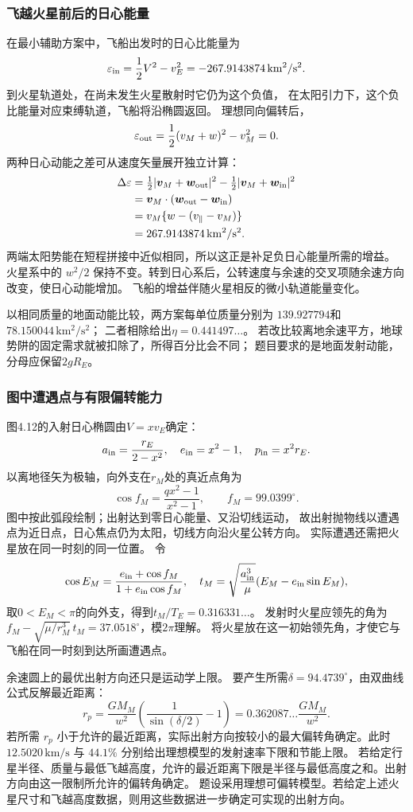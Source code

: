 \documentclass[UTF8,fontset=fandol,a4paper,11pt]{ctexart}
\newcommand{\vect}[1]{\bm{#1}}
\begin{document}
\subsubsection*{飞越火星前后的日心能量}
在最小辅助方案中，飞船出发时的日心比能量为
\[
\varepsilon_{\rm in}
=\frac12V^2-v_E^2
 =-267.9143874\,\mathrm{km^2/s^2}.
\]
到火星轨道处，在尚未发生火星散射时它仍为这个负值，
在太阳引力下，这个负比能量对应束缚轨道，飞船将沿椭圆返回。
理想同向偏转后，
\[
\varepsilon_{\rm out}
=\frac12(v_M+w)^2-v_M^2=0.
\]
两种日心动能之差可从速度矢量展开独立计算：
\[
\begin{aligned}
\Delta\varepsilon
&=\tfrac12|\vect v_M+\vect w_{\rm out}|^2
-\tfrac12|\vect v_M+\vect w_{\rm in}|^2\\
&=\vect v_M\cdot(\vect w_{\rm out}-\vect w_{\rm in})\\
&=v_M\{w-(v_\parallel-v_M)\}\\
&=267.9143874\,\mathrm{km^2/s^2}.
\end{aligned}
\]
两端太阳势能在短程拼接中近似相同，所以这正是补足负日心能量所需的增益。
火星系中的 $w^2/2$ 保持不变。转到日心系后，公转速度与余速的交叉项随余速方向改变，使日心动能增加。
飞船的增益伴随火星相反的微小轨道能量变化。

以相同质量的地面动能比较，两方案每单位质量分别为
$139.927794$和$78.150044\,\mathrm{km^2/s^2}$；
二者相除给出$\eta=0.441497\ldots$。
若改比较离地余速平方，地球势阱的固定需求就被扣除了，所得百分比会不同；
题目要求的是地面发射动能，分母应保留$2gR_E$。

\subsubsection*{图中遭遇点与有限偏转能力}
图4.12的入射日心椭圆由$V=xv_E$确定：
\[
a_{\rm in}=\frac{r_E}{2-x^2},\quad
e_{\rm in}=x^2-1,\quad
p_{\rm in}=x^2r_E.
\]
以离地径矢为极轴，向外支在$r_M$处的真近点角为
\[
\cos f_M=\frac{qx^2-1}{x^2-1},\qquad
f_M=99.0399^\circ.
\]
图中按此弧段绘制；出射达到零日心能量、又沿切线运动，
故出射抛物线以遭遇点为近日点，日心焦点仍为太阳，切线方向沿火星公转方向。
实际遭遇还需把火星放在同一时刻的同一位置。
令
\[
\cos E_M=\frac{e_{\rm in}+\cos f_M}{1+e_{\rm in}\cos f_M},
\quad
t_M=\sqrt{\frac{a_{\rm in}^3}{\mu}}
(E_M-e_{\rm in}\sin E_M),
\]
取$0<E_M<\pi$的向外支，得到$t_M/T_E=0.316331\ldots$。
发射时火星应领先的角为
$f_M-\sqrt{\mu/r_M^3}\,t_M=37.0518^\circ$，模$2\pi$理解。
将火星放在这一初始领先角，才使它与飞船在同一时刻到达所画遭遇点。

余速圆上的最优出射方向还只是运动学上限。
要产生所需$\delta=94.4739^\circ$，由双曲线公式反解最近距离：
\[
r_p=\frac{GM_M}{w^2}
\left(\frac1{\sin(\delta/2)}-1\right)
=0.362087\ldots\frac{GM_M}{w^2}.
\]
若所需 $r_p$ 小于允许的最近距离，实际出射方向按较小的最大偏转角确定。此时 $12.5020\,\mathrm{km/s}$ 与 $44.1\%$ 分别给出理想模型的发射速率下限和节能上限。
若给定行星半径、质量与最低飞越高度，允许的最近距离下限是半径与最低高度之和。出射方向由这一限制所允许的偏转角确定。
题设采用理想可偏转模型。若给定上述火星尺寸和飞越高度数据，则用这些数据进一步确定可实现的出射方向。
\end{document}
